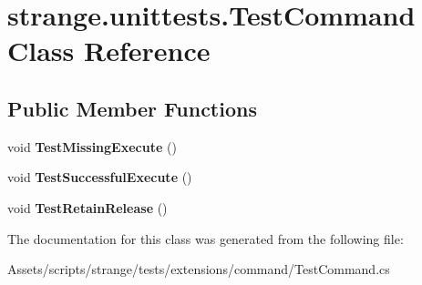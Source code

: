 \hypertarget{classstrange_1_1unittests_1_1_test_command}{\section{strange.\-unittests.\-Test\-Command Class Reference}
\label{classstrange_1_1unittests_1_1_test_command}
}
\subsection*{Public Member Functions}
\begin{DoxyCompactItemize}
\item 
\hypertarget{classstrange_1_1unittests_1_1_test_command_ae1fa4251f95fd1ef5aedb6543a0c0020}{void {\bfseries Test\-Missing\-Execute} ()}\label{classstrange_1_1unittests_1_1_test_command_ae1fa4251f95fd1ef5aedb6543a0c0020}

\item 
\hypertarget{classstrange_1_1unittests_1_1_test_command_a8815a4749e1999e728e08e209db682c0}{void {\bfseries Test\-Successful\-Execute} ()}\label{classstrange_1_1unittests_1_1_test_command_a8815a4749e1999e728e08e209db682c0}

\item 
\hypertarget{classstrange_1_1unittests_1_1_test_command_a573658bddda100f40aac77cb43ff710d}{void {\bfseries Test\-Retain\-Release} ()}\label{classstrange_1_1unittests_1_1_test_command_a573658bddda100f40aac77cb43ff710d}

\end{DoxyCompactItemize}


The documentation for this class was generated from the following file\-:\begin{DoxyCompactItemize}
\item 
Assets/scripts/strange/tests/extensions/command/Test\-Command.\-cs\end{DoxyCompactItemize}
